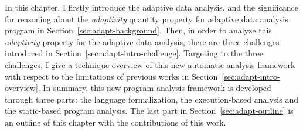 In this chapter, 
I firstly introduce the adaptive data analysis, and the
significance for reasoning about the \emph{adaptivity} quantity property 
for adaptive data analysis program in Section~\ref{sec:adapt-background}.
Then, in order to analyze this \emph{adaptivity} property for the adaptive data analysis,
there are three challenges
introduced in Section~\ref{sec:adapt-intro-challenge}.
Targeting to the three challenges, I give a technique overview of this new automatic analysis framework with respect to
the limitations of previous works
in Section~\ref{sec:adapt-intro-overview}.
In summary, this new program analysis framework is developed through three parts:
the language formalization,
the execution-based analysis and the static-based program analysis.
The last part in Section~\ref{sec:adapt-outline} is an outline of this chapter with the contributions of this work.



